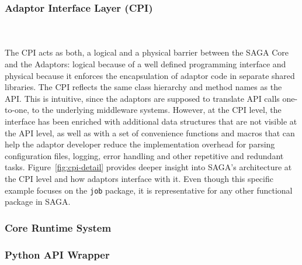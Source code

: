   \subsubsection{Adaptor Interface Layer (CPI)}
  \\
  \\
  The CPI acts as both,
  a logical and a physical barrier between the SAGA Core and the Adaptors:
  logical because of a well defined programming interface and physical because
  it enforces the encapsulation of adaptor code in separate shared libraries.
  The CPI reflects the same class hierarchy and method names as the API. This
  is intuitive, since the adaptors are supposed to translate API calls
  one-to-one, to the underlying middleware systems. However, at the CPI level,
  the interface has been enriched with additional data structures that are not
  visible at the API level, as well as with a set of convenience functions and
  macros that can help the adaptor developer reduce the implementation overhead
  for parsing configuration files, logging, error handling and other repetitive
  and redundant tasks. Figure~\ref{fig:cpi-detail} provides deeper insight into
  SAGA's architecture at the CPI level and how adaptors interface with it. Even
  though this specific example focuses on the \texttt{job} package, it is
  representative for any other functional package in SAGA.
 
 
  \subsubsection{Core Runtime System}


  \subsubsection{Python API Wrapper}
  \\
  

